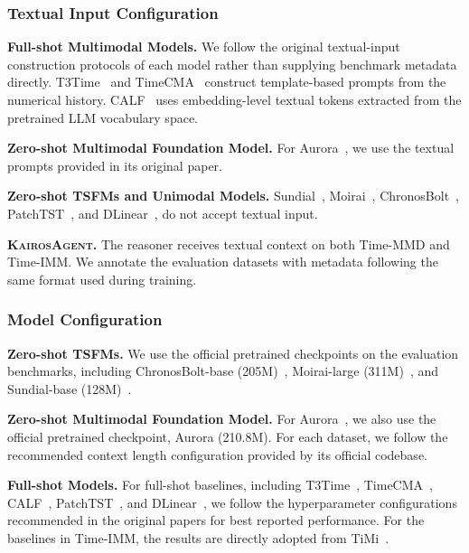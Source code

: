 \documentclass[11pt]{article}
\newcommand{\method}{\textsc{KairosAgent}\xspace}
\newcommand{\minisection}[1]{\vspace{5pt}\noindent\textbf{#1.}}
\begin{document}
\subsubsection{Textual Input Configuration}
\label{app:textual_input_config}

\minisection{Full-shot Multimodal Models}
We follow the original textual-input construction protocols of each model rather than supplying benchmark metadata directly.
T3Time~\citep{chowdhury2026t3time} and TimeCMA~\citep{liu2025timecma} construct template-based prompts from the numerical history.
CALF~\citep{liu2025calf} uses embedding-level textual tokens extracted from the pretrained LLM vocabulary space.

\minisection{Zero-shot Multimodal Foundation Model}
For Aurora~\citep{wu2025aurora}, we use the textual prompts provided in its original paper.

\minisection{Zero-shot TSFMs and Unimodal Models}
Sundial~\citep{liu2025sundial}, Moirai~\citep{woo2024unified}, ChronosBolt~\citep{ansarichronos}, PatchTST~\citep{nie2023time}, and DLinear~\citep{zeng2023transformers},  do not accept textual input.

\minisection{\method}
The reasoner receives textual context on both Time-MMD and Time-IMM.
We annotate the evaluation datasets with metadata following the same format used during training.

\subsubsection{Model Configuration}

\minisection{Zero-shot TSFMs}
We use the official pretrained checkpoints on the evaluation benchmarks, including ChronosBolt-base (205M)~\citep{ansarichronos}, Moirai-large (311M)~\citep{woo2024unified}, and Sundial-base (128M)~\citep{liu2025sundial}.

\minisection{Zero-shot Multimodal Foundation Model}
For Aurora~\citep{wu2025aurora}, we also use the official pretrained checkpoint, Aurora (210.8M).
For each dataset, we follow the recommended context length configuration provided by its official codebase.

\minisection{Full-shot Models}
For full-shot baselines, including T3Time~\citep{chowdhury2026t3time}, TimeCMA~\citep{liu2025timecma}, CALF~\citep{liu2025calf}, PatchTST~\citep{nie2023time}, and DLinear~\citep{zeng2023transformers}, we follow the hyperparameter configurations recommended in the original papers for best reported performance.
For the baselines in Time-IMM, the results are directly adopted from TiMi~\citep{lin2026timi}.
\end{document}
